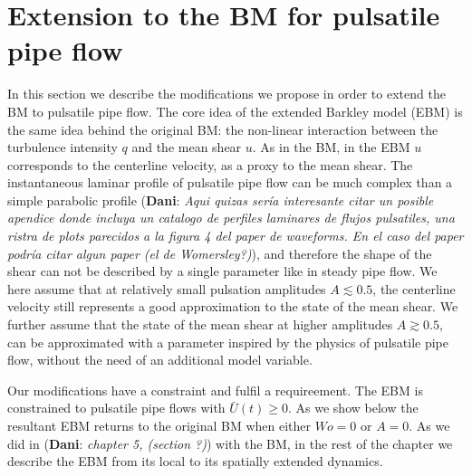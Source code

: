 \documentclass{article}
\DeclareRobustCommand{\dm}[1]{{\color{blue}(\textbf{Dani}: \textit{#1}\xspace)}}
\begin{document}
\section{Extension to the BM for pulsatile pipe flow}
In this section we describe the modifications we propose in order to extend the BM to pulsatile pipe flow. The core idea of the extended Barkley model (EBM) is the same idea behind the original BM: the non-linear interaction between the turbulence intensity $q$ and the mean shear $u$. As in the BM, in the EBM $u$ corresponds to the centerline velocity, as a proxy to the  mean shear. The instantaneous laminar profile of pulsatile pipe flow can be much complex than a simple parabolic profile \dm{Aqui quizas sería interesante citar un posible apendice donde incluya un catalogo de perfiles laminares de flujos pulsatiles, una ristra de plots parecidos a la figura 4 del paper de waveforms. En el caso del paper podría citar algun paper (el de Womersley?)}, and therefore the shape of the shear can not be described by a single parameter like in steady pipe flow. We here assume that at relatively small pulsation amplitudes $A \lesssim 0.5$, the centerline velocity still represents a good approximation to the state of the mean shear. We further assume that the state of the mean shear at higher amplitudes $A \gtrsim 0.5$, can be approximated with a parameter inspired by the physics of pulsatile pipe flow, without the need of an additional model variable. 

Our modifications have a constraint and fulfil a requireement. The EBM is constrained to pulsatile pipe flows with $\bar{U}\left( t \right) \geq 0$. As we show below the resultant EBM returns to the original BM when either $Wo=0$ or $A=0$. As we did in \dm{chapter 5, (section ?)} with the BM, in the rest of the chapter we describe the EBM from its local to its spatially extended dynamics.





\end{document}
